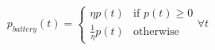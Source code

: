 \begin{equation}
	p_{battery}(t) =
	\begin{cases}
		\eta p(t) &\text{if } p(t) \geq 0\\
		\frac{1}{\eta}p(t) &\text{otherwise}
	\end{cases}
	\forall t
	\label{ch2:equ:battery-power}
\end{equation}